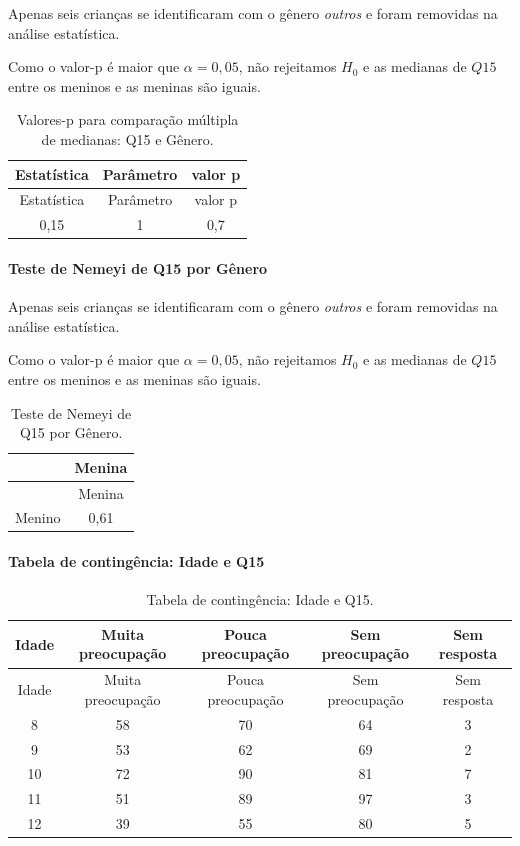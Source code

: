 \documentclass[]{article}
\let\oldparagraph\paragraph
\renewcommand{\paragraph}[1]{\oldparagraph{#1}\mbox{}}
\begin{document}
Apenas seis crianças se identificaram com o gênero \emph{outros} e foram removidas na análise estatística.

Como o valor-p é maior que \(\alpha=0,05\), não rejeitamos \(H_0\) e as medianas de \(Q15\) entre os meninos e as meninas são iguais.

\begin{longtable}[]{@{}ccc@{}}
\caption{\label{tab:unnamed-chunk-110}Valores-p para comparação múltipla de medianas: Q15 e Gênero.}\tabularnewline
\toprule
Estatística & Parâmetro & valor p\tabularnewline
\midrule
\endfirsthead
\toprule
Estatística & Parâmetro & valor p\tabularnewline
\midrule
\endhead
0,15 & 1 & 0,7\tabularnewline
\bottomrule
\end{longtable}

\hypertarget{teste-de-nemeyi-de-q15-por-guxeanero}{%
\paragraph{Teste de Nemeyi de Q15 por Gênero}\label{teste-de-nemeyi-de-q15-por-guxeanero}}

Apenas seis crianças se identificaram com o gênero \emph{outros} e foram removidas na análise estatística.

Como o valor-p é maior que \(\alpha=0,05\), não rejeitamos \(H_0\) e as medianas de \(Q15\) entre os meninos e as meninas são iguais.

\begin{longtable}[]{@{}lc@{}}
\caption{\label{tab:unnamed-chunk-111}Teste de Nemeyi de Q15 por Gênero.}\tabularnewline
\toprule
& Menina\tabularnewline
\midrule
\endfirsthead
\toprule
& Menina\tabularnewline
\midrule
\endhead
Menino & 0,61\tabularnewline
\bottomrule
\end{longtable}

\cleardoublepage

\hypertarget{tabela-de-continguxeancia-idade-e-q15}{%
\paragraph{Tabela de contingência: Idade e Q15}\label{tabela-de-continguxeancia-idade-e-q15}}

\begin{longtable}[]{@{}ccccc@{}}
\caption{\label{tab:unnamed-chunk-112}Tabela de contingência: Idade e Q15.}\tabularnewline
\toprule
Idade & Muita preocupação & Pouca preocupação & Sem preocupação & Sem resposta\tabularnewline
\midrule
\endfirsthead
\toprule
Idade & Muita preocupação & Pouca preocupação & Sem preocupação & Sem resposta\tabularnewline
\midrule
\endhead
8 & 58 & 70 & 64 & 3\tabularnewline
9 & 53 & 62 & 69 & 2\tabularnewline
10 & 72 & 90 & 81 & 7\tabularnewline
11 & 51 & 89 & 97 & 3\tabularnewline
12 & 39 & 55 & 80 & 5\tabularnewline
\bottomrule
\end{longtable}
\end{document}

